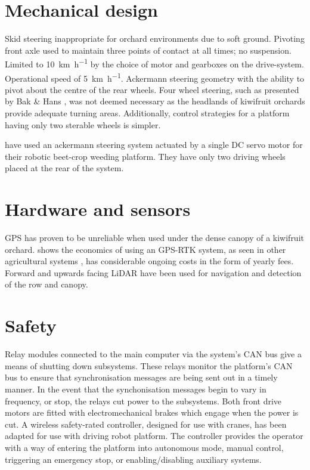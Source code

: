 \documentclass[preprint,authoryear,12pt]{elsarticle}
\begin{document}
\section{Mechanical design}
\label{sect:mechanical}
Skid steering inappropriate for orchard environments due to soft ground.
Pivoting front axle used to maintain three points of contact at all times; no suspension.
Limited to \SI{10}{\kilo\meter\per\hour} by the choice of motor and gearboxes on the drive-system.
Operational speed of \SI{5}{\kilo\meter\per\hour}.
Ackermann steering geometry with the ability to pivot about the centre of the rear wheels.
Four wheel steering, such as presented by Bak \& Hans \citep{Bak2004}, was not deemed necessary as the headlands of kiwifruit orchards provide adequate turning areas.
Additionally, control strategies for a platform having only two sterable wheels is simpler.



\citep{Astrand2002} have used an ackermann steering system actuated by a single DC servo motor for their robotic beet-crop weeding platform. They have only two driving wheels placed at the rear of the system.




\section{Hardware and sensors}
\label{sect:hardware}
GPS has proven to be unreliable when used under the dense canopy of a kiwifruit orchard.
\citep{Pedersen2006} shows the economics of using an GPS-RTK system, as seen in other agricultural systems \citep{Bak2004,Ruckelshausen2009}, has considerable ongoing costs in the form of yearly fees.
Forward and upwards facing LiDAR have been used for navigation and detection of the row and canopy.


\section{Safety}
Relay modules connected to the main computer via the system's CAN bus give a means of shutting down subsystems.
These relays monitor the platform's CAN bus to ensure that synchronisation messages are being sent out in a timely manner.
In the event that the synchonisation messages begin to vary in frequency, or stop, the relays cut power to the subsystems.
Both front drive motors are fitted with electromechanical brakes which engage when the power is cut.
A wireless safety-rated controller, designed for use with cranes, has been adapted for use with driving robot platform.
The controller provides the operator with a way of entering the platform into autonomous mode, manual control, triggering an emergency stop, or enabling/disabling auxiliary systems.
\end{document}
